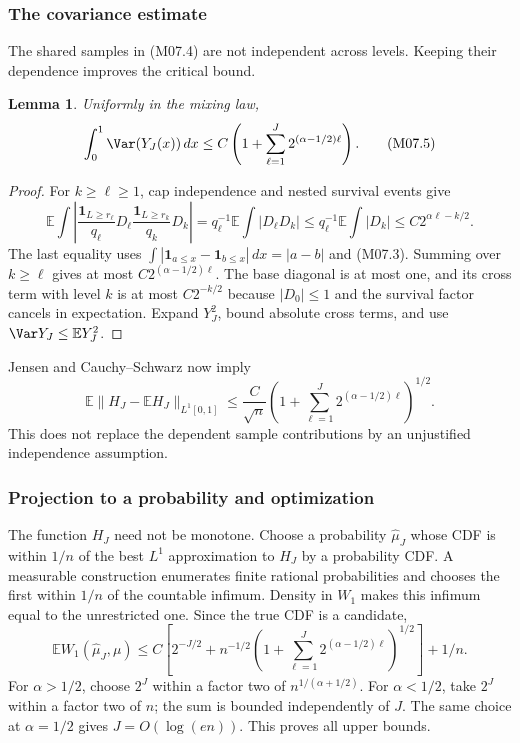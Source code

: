 \documentclass[11pt,a4paper]{article}
\newtheorem{lemma}[theorem]{Lemma}
\theoremstyle{definition}\newtheorem{definition}[theorem]{Definition}
\theoremstyle{remark}\newtheorem{remark}[theorem]{Remark}
\newcommand{\E}{\mathbb E}\newcommand{\one}{\mathbf 1}\newcommand{\1}{\mathbf 1}
\numberwithin{equation}{section}
\begin{document}
\subsubsection{The covariance estimate}
The shared samples in (M07.4) are not independent across levels. Keeping their dependence improves the critical bound.
\begin{lemma}\label{M07-lem:var}
Uniformly in the mixing law,
\[
 \int_0^1\Var(Y_J(x))\,dx
 \le C\left(1+\sum_{\ell=1}^J2^{(\alpha-1/2)\ell}\right).
\tag{M07.5}
\]
\end{lemma}
\begin{proof}
For $k\ge\ell\ge1$, cap independence and nested survival events give
\[
 \E\int\left|\frac{\1_{L\ge r_\ell}}{q_\ell}D_\ell
                 \frac{\1_{L\ge r_k}}{q_k}D_k\right|
 =q_\ell^{-1}\E\int|D_\ell D_k|
 \le q_\ell^{-1}\E\int|D_k|
 \le C2^{\alpha\ell-k/2}.
\]
The last equality uses $\int|\1_{a\le x}-\1_{b\le x}|\,dx=|a-b|$ and (M07.3). Summing over $k\ge\ell$ gives at most $C2^{(\alpha-1/2)\ell}$. The base diagonal is at most one, and its cross term with level $k$ is at most $C2^{-k/2}$ because $|D_0|\le1$ and the survival factor cancels in expectation. Expand $Y_J^2$, bound absolute cross terms, and use $\Var Y_J\le\E Y_J^2$.
\end{proof}
Jensen and Cauchy--Schwarz now imply
\[
 \E\|H_J-\E H_J\|_{L^1[0,1]}
 \le\frac C{\sqrt n}\left(1+\sum_{\ell=1}^J2^{(\alpha-1/2)\ell}\right)^{1/2}.
\tag{M07.6}
\]
This does not replace the dependent sample contributions by an unjustified independence assumption.

\subsubsection{Projection to a probability and optimization}
The function $H_J$ need not be monotone. Choose a probability $\widehat\mu_J$ whose CDF is within $1/n$ of the best $L^1$ approximation to $H_J$ by a probability CDF. A measurable construction enumerates finite rational probabilities and chooses the first within $1/n$ of the countable infimum. Density in $W_1$ makes this infimum equal to the unrestricted one. Since the true CDF is a candidate,
\[
 \E W_1(\widehat\mu_J,\mu)
 \le C\left[2^{-J/2}
 +n^{-1/2}\left(1+\sum_{\ell=1}^J2^{(\alpha-1/2)\ell}\right)^{1/2}\right]+1/n.
\tag{M07.7}
\]
For $\alpha>1/2$, choose $2^J$ within a factor two of $n^{1/(\alpha+1/2)}$. For $\alpha<1/2$, take $2^J$ within a factor two of $n$; the sum is bounded independently of $J$. The same choice at $\alpha=1/2$ gives $J=O(\log(en))$. This proves all upper bounds.
\end{document}
